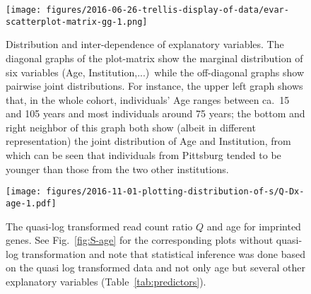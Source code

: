 \documentclass[letterpaper]{article}
\begin{document}
\begin{figure}[H]
\begin{center}
\texttt{[image: figures/2016-06-26-trellis-display-of-data/evar-scatterplot-matrix-gg-1.png]}
\end{center}
\caption{
Distribution and inter-dependence of explanatory variables.  The diagonal graphs of the
plot-matrix show the marginal distribution of six variables (Age,
Institution,...)~while the off-diagonal graphs show pairwise joint
distributions.  For instance, the upper left graph shows that, in the whole
cohort, individuals' Age
ranges between ca.~15 and 105 years and most individuals around 75 years; the
bottom and right neighbor of this graph both show (albeit in different
representation) the joint distribution of Age and Institution, from which can
be seen that individuals from Pittsburg tended to be younger than those from
the two other institutions.
}
\label{fig:predictor-associations}
\end{figure}

\begin{figure}[H]
\begin{center}
\texttt{[image: figures/2016-11-01-plotting-distribution-of-s/Q-Dx-age-1.pdf]}
\end{center}
\caption{
The quasi-log transformed read count ratio \(Q\) and age for imprinted genes.
See Fig.~\ref{fig:S-age} for the corresponding plots without quasi-log
transformation and note that statistical inference was done based on the quasi
log transformed data and not only age but several other explanatory variables
(Table~\ref{tab:predictors}).
}
\label{fig:Q-age}
\end{figure}
\end{document}
